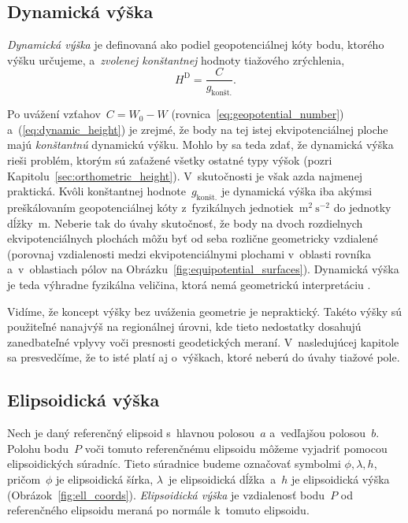 \documentclass[a4paper, 12pt]{book}
\begin{document}
\subsection{Dynamická výška}
\label{sec:dynamic_height}

\emph{Dynamická výška} je definovaná ako podiel geopotenciálnej kóty bodu, 
ktorého výšku určujeme, a~\emph{zvolenej konštantnej} hodnoty tiažového 
zrýchlenia,
%
\begin{equation}
\label{eq:dynamic_height}
H^\mathrm{D} = \frac{C}{g_\textrm{kon\v{s}t.}}{.}
\end{equation}

Po uvážení vzťahov~$C = W_0 - W$ (rovnica~\ref{eq:geopotential_number}) 
a~(\ref{eq:dynamic_height}) je zrejmé, že body na tej istej ekvipotenciálnej 
ploche majú \emph{konštantnú} dynamickú výšku.  Mohlo by sa teda zdať, že 
dynamická výška rieši problém, ktorým sú zaťažené všetky ostatné typy výšok 
(pozri Kapitolu~\ref{sec:orthometric_height}).  V~skutočnosti je však azda 
najmenej praktická.  Kvôli konštantnej hodnote~$g_{\textrm{konšt.}}$ je 
dynamická výška iba akýmsi preškálovaním geopotenciálnej kóty z~fyzikálnych 
jednotiek~$\mathrm{m}^2 \ \mathrm{s}^{-2}$ do jednotky dĺžky~$\mathrm{m}$.  
Neberie tak do úvahy skutočnosť, že body na dvoch rozdielnych ekvipotenciálnych 
plochách môžu byť od seba rozlične geometricky vzdialené (porovnaj vzdialenosti 
medzi ekvipotenciálnymi plochami v~oblasti rovníka a~v~oblastiach pólov na 
Obrázku~\ref{fig:equipotential_surfaces}).  Dynamická výška je teda výhradne 
fyzikálna veličina, ktorá nemá geometrickú interpretáciu 
\parencite{Jekeli2000a}.

Vidíme, že koncept výšky bez uváženia geometrie je nepraktický.  Takéto výšky 
sú použiteľné nanajvýš na regionálnej úrovni, kde tieto nedostatky dosahujú 
zanedbateľné vplyvy voči presnosti geodetických meraní.  V~nasledujúcej 
kapitole sa presvedčíme, že to isté platí aj o~výškach, ktoré neberú do úvahy 
tiažové pole.

\subsection{Elipsoidická výška}
\label{sec:ellipsoidal_height}

Nech je daný referenčný elipsoid s~hlavnou polosou~$a$ a~vedľajšou polosou~$b$.  
Polohu bodu~$P$ voči tomuto referenčnému elipsoidu môžeme vyjadriť pomocou 
elipsoidických súradníc.  Tieto súradnice budeme označovať symbolmi $\phi, 
\lambda, h$, pričom~$\phi$ je elipsoidická šírka, $\lambda$~je elipsoidická 
dĺžka~a~$h$ je elipsoidická výška (Obrázok~\ref{fig:ell_coords}).  
\emph{Elipsoidická výška} je vzdialenosť bodu~$P$ od referenčného elipsoidu 
meraná po normále k~tomuto elipsoidu.
\end{document}
